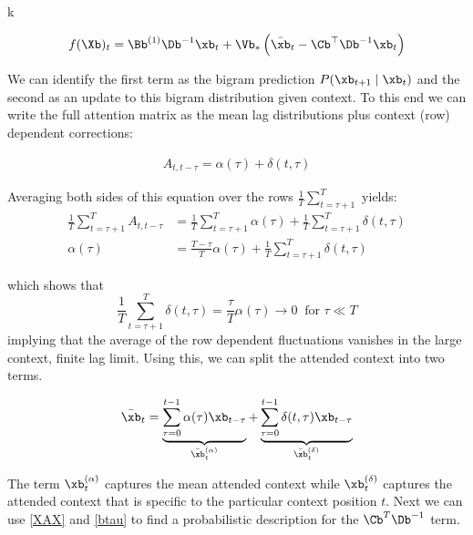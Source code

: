 k\documentclass{article}
\begin{document}
\begin{align}
    f(\Xb)_t = \Bb^{(1)}\Db^{-1}\xb_t + \Vb_* \left ( \bar{\xb}_t - \Cb^\top\Db^{-1} \xb_t \right ) 
\end{align} 

We can identify the first term as the bigram prediction $P(\xb_{t+1} \mid \xb_t)$ and the second as an update to this bigram distribution given context. To this end we can write the full attention matrix as the mean lag distributions plus context (row) dependent corrections:

\begin{align}
    A_{t,t-\tau} = \alpha(\tau) + \delta(t, \tau)
\end{align}

Averaging both sides of this equation over the rows $\frac{1}{T}\sum_{t=\tau+1}^T$ yields:
\begin{align}
    \frac{1}{T}\sum_{t=\tau+1}^T A_{t,t-\tau} &= \frac{1}{T}\sum_{t=\tau+1}^T \alpha(\tau) + \frac{1}{T}\sum_{t=\tau+1}^T\delta(t, \tau) \\
    \alpha(\tau) &= \frac{T-\tau}{T}\alpha(\tau) + \frac{1}{T}\sum_{t=\tau+1}^T\delta(t, \tau)
\end{align}

which shows that 
\begin{equation}
    \frac{1}{T}\sum_{t=\tau+1}^T  \delta(t, \tau) = \frac{\tau}{T} \alpha(\tau) \to 0 \;\; \text{for $\tau \ll T$}
\end{equation}
implying that the average of the row dependent fluctuations vanishes in the large context, finite lag limit. Using this, we can split the attended context into two terms.

\begin{align}
    \bar{\xb}_t = \underbrace{\sum_{\tau=0}^{t-1}\alpha(\tau)\xb_{t-\tau}}_{\bar{\xb}_t^{(\alpha)}} +  \underbrace{\sum_{\tau=0}^{t-1}\delta(t,\tau)\xb_{t-\tau}}_{\bar{\xb}_t^{(\delta)}}
\end{align}

The term $\xb_t^{(\alpha)}$ captures the mean attended context while $\xb_t^{(\delta)}$ captures the attended context that is specific to the particular context position $t$. Next we can use \eqref{XAX} and \eqref{btau} to find a probabilistic description for the $\Cb^T\Db^{-1}$ term. 
\end{document}
